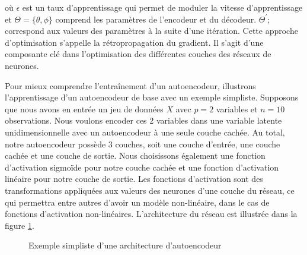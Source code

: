 \noindent où $\epsilon$ est un taux d'apprentissage qui permet de moduler la vitesse d'apprentissage et $\Theta = \{\theta, \phi\}$ comprend les paramètres de l'encodeur et du décodeur. $\Theta^{'}$; correspond aux valeurs des paramètres à la suite d'une itération. Cette approche d'optimisation s'appelle la rétropropagation du gradient. Il s'agit d'une composante clé dans l'optimisation des différentes couches des réseaux de neurones.

Pour mieux comprendre l'entraînement d'un autoencodeur, illustrons l'apprentissage d'un autoencodeur de base avec un exemple simpliste. Supposons que nous avons en entrée un jeu de données $X$ avec $p=2$ variables et $n=10$ observations. Nous voulons encoder ces 2 variables dans une variable latente unidimensionnelle avec un autoencodeur à une seule couche cachée. Au total, notre autoencodeur possède 3 couches, soit une couche d'entrée, une couche cachée et une couche de sortie. Nous choisissons également une fonction d'activation sigmoïde pour notre couche cachée et une fonction d'activation linéaire pour notre couche de sortie. Les fonctions d'activation sont des transformations appliquées aux valeurs des neurones d'une couche du réseau, ce qui permettra entre autres d'avoir un modèle non-linéaire, dans le cas de fonctions d'activation non-linéaires. L'architecture du réseau est illustrée dans la figure \ref{fig:toyAE}.

\begin{figure}[htb]
	\centering
	\caption{Exemple simpliste d'une architecture d'autoencodeur}
	\label{fig:toyAE}
\end{figure}

